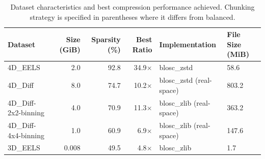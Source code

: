 \begin{table}[h]
\centering
\caption{Dataset characteristics and best compression performance achieved. Chunking strategy is specified in parentheses where it differs from balanced.}
\label{tab:dataset_summary}
\begin{tabular}{lrrrll}
\hline
Dataset & Size (GiB) & Sparsity (\%) & Best Ratio & Implementation & File Size (MiB) \\
\hline
4D\_EELS & 2.0 & 92.8 & 34.9$\times$ & blosc\_zstd & 58.6 \\
4D\_Diff & 8.0 & 74.7 & 10.2$\times$ & blosc\_zstd (real-space) & 803.2 \\
4D\_Diff-2x2-binning & 4.0 & 70.9 & 11.3$\times$ & blosc\_zlib (real-space) & 363.2 \\
4D\_Diff-4x4-binning & 1.0 & 60.9 & 6.9$\times$ & blosc\_zlib (real-space) & 147.6 \\
3D\_EELS & 0.008 & 49.5 & 4.8$\times$ & blosc\_zlib & 1.7 \\
\hline
\end{tabular}
\end{table}
